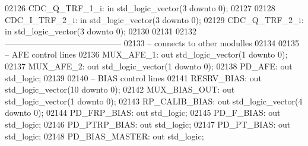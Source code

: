 \begin{DoxyCode}
02126     CDC\_Q\_TRF\_1\_i:  \textcolor{keywordflow}{in} \textcolor{comment}{std\_logic\_vector}(\textcolor{vhdllogic}{}\textcolor{vhdllogic}{3} \textcolor{keywordflow}{downto} \textcolor{vhdllogic}{}\textcolor{vhdllogic}{0});
02127 
02128     CDC\_I\_TRF\_2\_i:  \textcolor{keywordflow}{in} \textcolor{comment}{std\_logic\_vector}(\textcolor{vhdllogic}{}\textcolor{vhdllogic}{3} \textcolor{keywordflow}{downto} \textcolor{vhdllogic}{}\textcolor{vhdllogic}{0});
02129     CDC\_Q\_TRF\_2\_i:  \textcolor{keywordflow}{in} \textcolor{comment}{std\_logic\_vector}(\textcolor{vhdllogic}{}\textcolor{vhdllogic}{3} \textcolor{keywordflow}{downto} \textcolor{vhdllogic}{}\textcolor{vhdllogic}{0});
02130     
02131     
02132 \textcolor{keyword}{    ------------------------------------------}
02133 \textcolor{keyword}{    -- connects to other modulles}
02134     
02135 \textcolor{keyword}{    -- AFE control lines}
02136     MUX\_AFE\_1:  \textcolor{keywordflow}{out} \textcolor{comment}{std\_logic\_vector}(\textcolor{vhdllogic}{}\textcolor{vhdllogic}{1} \textcolor{keywordflow}{downto} \textcolor{vhdllogic}{}\textcolor{vhdllogic}{0});
02137     MUX\_AFE\_2:  \textcolor{keywordflow}{out} \textcolor{comment}{std\_logic\_vector}(\textcolor{vhdllogic}{}\textcolor{vhdllogic}{1} \textcolor{keywordflow}{downto} \textcolor{vhdllogic}{}\textcolor{vhdllogic}{0});
02138     PD\_AFE: \textcolor{keywordflow}{out} \textcolor{comment}{std\_logic};
02139 
02140 \textcolor{keyword}{    -- BIAS control lines}
02141     RESRV\_BIAS: \textcolor{keywordflow}{out} \textcolor{comment}{std\_logic\_vector}(\textcolor{vhdllogic}{}\textcolor{vhdllogic}{10} \textcolor{keywordflow}{downto} \textcolor{vhdllogic}{}\textcolor{vhdllogic}{0});
02142     MUX\_BIAS\_OUT:   \textcolor{keywordflow}{out} \textcolor{comment}{std\_logic\_vector}(\textcolor{vhdllogic}{}\textcolor{vhdllogic}{1} \textcolor{keywordflow}{downto} \textcolor{vhdllogic}{}\textcolor{vhdllogic}{0});
02143     RP\_CALIB\_BIAS:  \textcolor{keywordflow}{out} \textcolor{comment}{std\_logic\_vector}(\textcolor{vhdllogic}{}\textcolor{vhdllogic}{4} \textcolor{keywordflow}{downto} \textcolor{vhdllogic}{}\textcolor{vhdllogic}{0});
02144     PD\_FRP\_BIAS:    \textcolor{keywordflow}{out} \textcolor{comment}{std\_logic};
02145     PD\_F\_BIAS:  \textcolor{keywordflow}{out} \textcolor{comment}{std\_logic};
02146     PD\_PTRP\_BIAS:   \textcolor{keywordflow}{out} \textcolor{comment}{std\_logic};
02147     PD\_PT\_BIAS: \textcolor{keywordflow}{out} \textcolor{comment}{std\_logic};
02148     PD\_BIAS\_MASTER: \textcolor{keywordflow}{out} \textcolor{comment}{std\_logic};

\end{DoxyCode}
